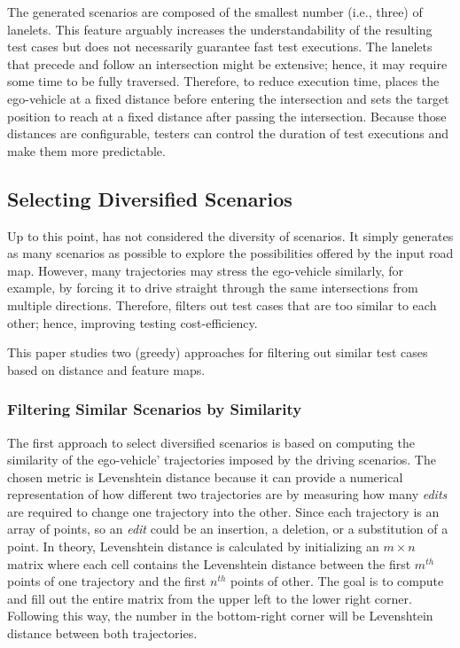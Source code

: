 \documentclass[conference]{IEEEtran}
\begin{document}
The generated scenarios are composed of the smallest number (i.e., three) of lanelets. This feature arguably increases the understandability of the resulting test cases but does not necessarily guarantee fast test executions. The lanelets that precede and follow an intersection might be extensive; hence, it may require some time to be fully traversed. Therefore, to reduce execution time, \tool places the ego-vehicle at a fixed distance before entering the intersection and sets the target position to reach at a fixed distance after passing the intersection. Because those distances are configurable, testers can control the duration of test executions and make them more predictable.


\subsection{Selecting Diversified Scenarios}
Up to this point, \tool has not considered the diversity of scenarios. It simply generates as many scenarios as possible to explore the possibilities offered by the input road map. However, many trajectories may stress the ego-vehicle similarly, for example, by forcing it to drive straight through the same intersections from multiple directions. Therefore, \tool filters out test cases that are too similar to each other; hence, improving testing cost-efficiency.

This paper studies two (greedy) approaches for filtering out similar test cases based on distance and feature maps.

\subsubsection{Filtering Similar Scenarios by Similarity}
The first approach to select diversified scenarios is based on computing the similarity of the ego-vehicle' trajectories imposed by the driving scenarios. The chosen metric is Levenshtein distance because it can provide a numerical representation of how different two trajectories are by measuring how many \emph{edits} are required to change one trajectory into the other. Since each trajectory is an array of points, so an \emph{edit} could be an insertion, a deletion, or a substitution of a point. In theory, Levenshtein distance is calculated by initializing an  $m\times n$ matrix where each cell contains the Levenshtein distance between the first $m^{th}$ points of one trajectory and the first $n^{th}$ points of other. The goal is to compute and fill out the entire matrix from the upper left to the lower right corner. Following this way, the number in the bottom-right corner will be Levenshtein distance between both trajectories.
%
\end{document}
